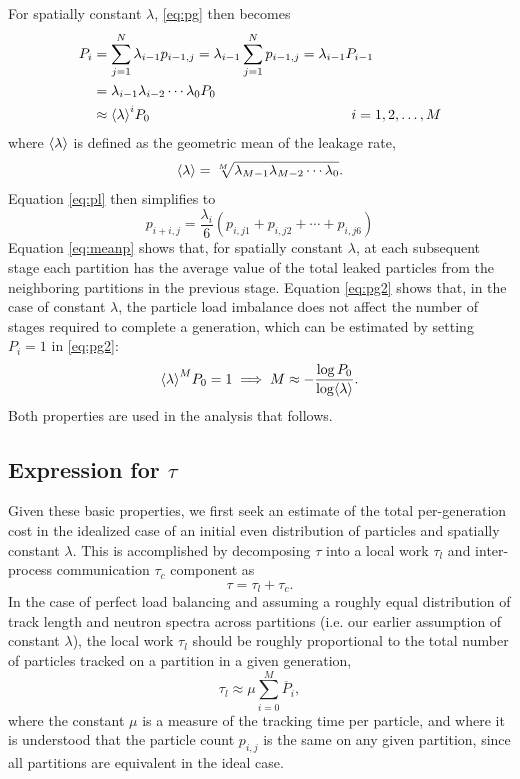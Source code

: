 For spatially constant $\lambda$, \eqref{eq:pg} then becomes
\begin{align}
  \label{eq:pg2}
  P_{i} &= \sum_{j=1}^N \lambda_{i-1} p_{i-1,j} = \lambda_{i-1}
  \sum_{j=1}^Np_{i-1,j} = \lambda_{i-1} P_{i-1} \nonumber \\
  &= \lambda_{i-1} \lambda_{i-2} \dotsm \lambda_{0} P_0 \nonumber \\
  &\approx {\langle \lambda \rangle}^{i} P_0 \hspace{2in} i=1,2,\dotsc,M
\end{align}
where $\langle \lambda \rangle$ is defined as the geometric mean of the leakage rate,
\begin{equation}
  \label{eq:cycle_mean}
  \langle \lambda \rangle = \sqrt[M]{\lambda_{M-1}\lambda_{M-2} \dotsm \lambda_{0} }.
\end{equation}
Equation \eqref{eq:pl} then simplifies to
\begin{equation}
  \label{eq:meanp}
  p_{i+i,j} = \frac{\lambda_i}{6} \left( p_{i,j1} + p_{i,j2} + \cdots + p_{i,j6}
  \right)
\end{equation}
Equation \eqref{eq:meanp} shows that, for spatially constant $\lambda$, at each
subsequent stage each partition has the average value of the total leaked
particles from the neighboring partitions in the previous stage.  Equation
\eqref{eq:pg2} shows that, in the case of constant $\lambda$, the particle load
imbalance does not affect the number of stages required to complete a
generation, which can be estimated by setting $P_i = 1$ in \eqref{eq:pg2}:
\begin{equation}
  \label{eq:kfinal}
  {\langle \lambda \rangle}^M P_0 = 1 \implies M \approx -\frac{\log P_0}{\log \langle \lambda \rangle}.
\end{equation}
Both properties are used in the analysis that follows.

\subsection{Expression for \texorpdfstring{$\tau$}{tau}}

Given these basic properties, we first seek an estimate of the total
per-generation cost in the idealized case of an initial even distribution of
particles and spatially constant $\lambda$.  This is accomplished by decomposing
$\tau$ into a local work $\tau_l$ and inter-process communication $\tau_c$
component as
\begin{equation}
  \tau = \tau_l + \tau_c.
\end{equation}
In the case of perfect load balancing and assuming a roughly equal distribution
of track length and neutron spectra across partitions (i.e. our earlier
assumption of constant $\lambda$), the local work $\tau_l$ should be roughly
proportional to the total number of particles tracked on a partition in a given
generation,
\begin{equation}
  \label{eq:loc_work}
  \tau_{l} \approx \mu \sum_{i=0}^{M} \overline{P}_{i},
\end{equation}
where the constant $\mu$ is a measure of the tracking time per particle, and
where it is understood that the particle count $p_{i,j}$ is the same on any
given partition, since all partitions are equivalent in the ideal case.

